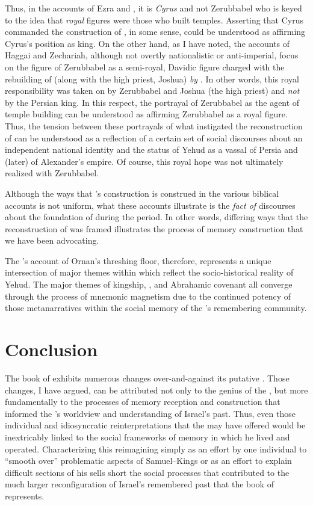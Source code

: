 Thus, in the accounts of Ezra and \chronicler, it is \emph{Cyrus} and not Zerubbabel who is keyed to the idea that \emph{royal} figures were those who built temples. Asserting that Cyrus commanded the construction of \thetemple, in some sense, could be understood as affirming Cyrus's position as king. On the other hand, as I have noted, the accounts of Haggai and Zechariah, although not overtly nationalistic or anti-imperial, focus on the figure of Zerubbabel as a semi-royal, Davidic figure charged with the rebuilding of \thetemple (along with the high priest, Joshua) \emph{by \yahweh}. In other words, this royal responsibility was taken on by Zerubbabel and Joshua (the high priest) and \emph{not} by the Persian king. In this respect, the portrayal of Zerubbabel as the agent of temple building can be understood as affirming Zerubbabel as a royal figure. Thus, the tension between these portrayals of what instigated the reconstruction of \thetemple can be understood as a reflection of a certain set of social discourses about an independent national identity and the status of Yehud as a vassal of Persia and (later) of Alexander's empire. Of course, this royal hope was not ultimately realized with Zerubbabel.

Although the ways that \thetemple's construction is construed in the various biblical accounts is not uniform, what these accounts illustrate is the \emph{fact of} discourses about the foundation of \thetemple during the \secondtemple period. In other words, differing ways that the reconstruction of \thetemple was framed illustrates the process of memory construction that we have been advocating.

The \chronicler's account of Ornan's threshing floor, therefore, represents a unique intersection of major themes within \chronicles which reflect the socio-historical reality of \secondtemple Yehud. The major themes of kingship, \thetemple, and Abrahamic covenant all converge through the process of mnemonic magnetism due to the continued potency of those metanarratives within the social memory of the \chronicler's remembering community.

\section{Conclusion}

The book of \chronicles exhibits numerous changes over-and-against its putative \vorlage. Those changes, I have argued, can be attributed not only to the genius of the \chronicler, but more fundamentally to the processes of memory reception and construction that informed the \chronicler's worldview and understanding of Israel's past. Thus, even those individual and idiosyncratic reinterpretations that the \chronicler may have offered would be inextricably linked to the social frameworks of memory in which he lived and operated. Characterizing this reimagining simply as an effort by one individual to ``smooth over'' problematic aspects of Samuel--Kings or as an effort to explain difficult sections of his \vorlage sells short the social processes that contributed to the much larger reconfiguration of Israel's remembered past that the book of \chronicles represents.


